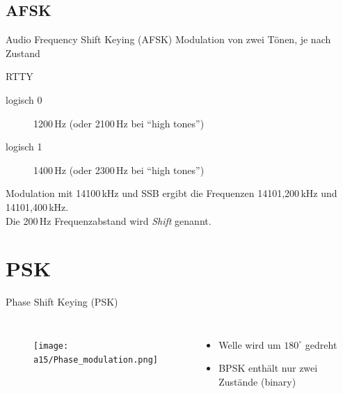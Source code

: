 \subsection{AFSK}
\begin{frame}{Audio Frequency Shift Keying (AFSK)}
  Modulation von zwei Tönen, je nach Zustand
  \begin{exampleblock}{RTTY}
    \begin{description}
      \item[logisch 0] 1200\,Hz (oder 2100\,Hz bei ``high tones'')
      \item[logisch 1] 1400\,Hz (oder 2300\,Hz bei ``high tones'')
    \end{description}
    Modulation mit 14100\,kHz und SSB ergibt die Frequenzen 14101,200\,kHz und 14101,400\,kHz.\\
    Die 200\,Hz Frequenzabstand wird \emph{Shift} genannt.
  \end{exampleblock}
\end{frame}

\section{PSK}
\begin{frame}{Phase Shift Keying (PSK)}
  \begin{columns}
    \begin{figure}
      \texttt{[image: a15/Phase\_modulation.png]}
    \end{figure}
    \begin{itemize}
      \item Welle wird um $180^\circ$ gedreht
      \item BPSK enthält nur zwei Zustände (binary)
    \end{itemize}
  \end{columns}
\end{frame}


